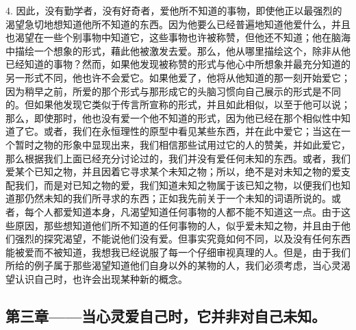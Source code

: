 4. 因此，没有勤学者，没有好奇者，爱他所不知道的事物，即使他正以最强烈的渴望急切地想知道他所不知道的东西。因为他要么已经普遍地知道他爱什么，并且也渴望在一些个别事物中知道它，这些事物也许被称赞，但他还不知道；他在脑海中描绘一个想象的形式，藉此他被激发去爱。那么，他从哪里描绘这个，除非从他已经知道的事物？然而，如果他发现被称赞的形式与他心中所想象并最充分知道的另一形式不同，他也许不会爱它。如果他爱了，他将从他知道的那一刻开始爱它；因为稍早之前，所爱的那个形式与那形成它的头脑习惯向自己展示的形式是不同的。但如果他发现它类似于传言所宣称的形式，并且如此相似，以至于他可以说；那么，即使那时，他也没有爱一个他不知道的形式，因为他已经在那个相似性中知道了它。或者，我们在永恒理性的原型中看见某些东西，并在此中爱它；当这在一个暂时之物的形象中显现出来，我们相信那些试用过它的人的赞美，并如此爱它，那么根据我们上面已经充分讨论过的，我们并没有爱任何未知的东西。或者，我们爱某个已知之物，并且因着它寻求某个未知之物；所以，绝不是对未知之物的爱支配我们，而是对已知之物的爱，我们知道未知之物属于该已知之物，以便我们也知道那仍然未知的我们所寻求的东西；正如我先前关于一个未知的词语所说的。或者，每个人都爱知道本身，凡渴望知道任何事物的人都不能不知道这一点。由于这些原因，那些想知道他们所不知道的任何事物的人，似乎爱未知之物，并且由于他们强烈的探究渴望，不能说他们没有爱。但事实究竟如何不同，以及没有任何东西能被爱而不被知道，我想我已经说服了每一个仔细审视真理的人。但是，由于我们所给的例子属于那些渴望知道他们自身以外的某物的人，我们必须考虑，当心灵渴望认识自己时，也许会出现某种新的概念。\par


\subsection{第三章——当心灵爱自己时，它并非对自己未知。}

